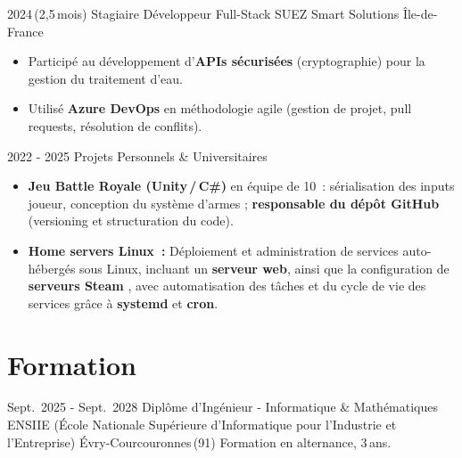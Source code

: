 \documentclass[11pt, a4paper]{moderncv}
\begin{document}
\cventry%
  {2024\,(2,5\,mois)}%
  {Stagiaire Développeur Full-Stack}%
  {SUEZ Smart Solutions}%
  {Île-de-France}%
  {}%
  {%
    \begin{itemize}
      \item Participé au développement 
            d'\textbf{APIs sécurisées} (cryptographie) pour la gestion
            du traitement d'eau.
      \item Utilisé \textbf{Azure DevOps} en méthodologie agile
            (gestion de projet, pull requests, résolution de conflits).
    \end{itemize}
  }

\cventry%
  {2022 - 2025}%
  {Projets Personnels \& Universitaires}%
  {}{}{}%
  {%
    \begin{itemize}
      \item \textbf{Jeu Battle Royale (Unity\,/\,C\#)} en équipe de 10~:
            sérialisation des inputs joueur, conception du système d'armes ;
            \textbf{responsable du dépôt GitHub}
            (versioning et structuration du code).
        \item \textbf{Home servers Linux~:}
        Déploiement et administration de services auto-hébergés sous Linux, incluant
        un \textbf{serveur web}, ainsi que
        la configuration de \textbf{serveurs Steam} , avec
        automatisation des tâches et du cycle de vie des services grâce à
        \textbf{systemd} et \textbf{cron}.
    \end{itemize}
  }

\section{Formation}

\cventry%
  {Sept.~2025 - Sept.~2028}%
  {Diplôme d'Ingénieur - Informatique \& Mathématiques}%
  {ENSIIE (École Nationale Supérieure d'Informatique
   pour l'Industrie et l'Entreprise)}%
  {Évry-Courcouronnes\,(91)}%
  {}%
  {Formation en alternance, 3\,ans.}
\end{document}
